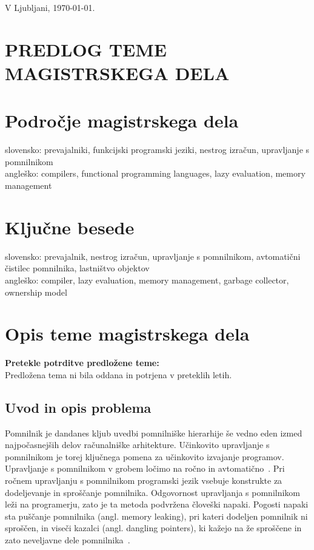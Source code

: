 \documentclass[a4paper, 12pt]{article}
\begin{document}
\bigskip


\hfill V Ljubljani, \today.
%




\clearpage
\section*{PREDLOG TEME MAGISTRSKEGA DELA}

\section{Področje magistrskega dela}

slovensko: prevajalniki, funkcijski programski jeziki, nestrog izračun, upravljanje s pomnilnikom \\
angleško: compilers, functional programming languages, lazy evaluation, memory management


\section{Ključne besede}

slovensko: prevajalnik, nestrog izračun, upravljanje s pomnilnikom, avtomatični čistilec pomnilnika, lastništvo objektov \\
angleško: compiler, lazy evaluation, memory management, garbage collector, ownership model


\section{Opis teme magistrskega dela}

\textbf{Pretekle potrditve predložene teme:}\\
Predložena tema ni bila oddana in potrjena v preteklih letih.

\subsection{Uvod in opis problema}

Pomnilnik je dandanes kljub uvedbi pomnilniške hierarhije še vedno eden izmed najpočasnejših delov računalniške arhitekture. Učinkovito upravljanje s pomnilnikom je torej ključnega pomena za učinkovito izvajanje programov. Upravljanje s pomnilnikom v grobem ločimo na ročno in avtomatično~\cite{jones2023garbage}. Pri ročnem upravljanju s pomnilnikom programski jezik vsebuje konstrukte za dodeljevanje in sproščanje pomnilnika. Odgovornost upravljanja s pomnilnikom leži na programerju, zato je ta metoda podvržena človeški napaki. Pogosti napaki sta puščanje pomnilnika (angl. memory leaking), pri kateri dodeljen pomnilnik ni sproščen, in viseči kazalci (angl. dangling pointers), ki kažejo na že sproščene in zato neveljavne dele pomnilnika~\cite{jones2023garbage}.
\end{document}
